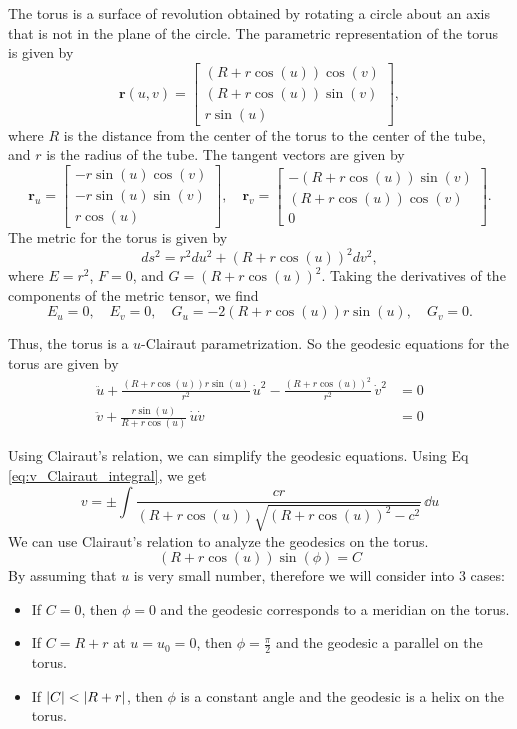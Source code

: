 \documentclass[12pt]{article}
\begin{document}
The torus is a surface of revolution obtained by rotating a circle about an axis that is not in the plane of the circle.
The parametric representation of the torus is given by
\[
    \mathbf{r}(u, v) = \begin{bmatrix} (R + r \cos (u)) \cos (v) \\ (R + r \cos (u)) \sin (v) \\ r \sin (u) \end{bmatrix},
\]
where \(R\) is the distance from the center of the torus to the center of the tube, and \(r\) is the radius of the tube.
The tangent vectors are given by
\[
    \mathbf{r}_u = \begin{bmatrix} -r \sin (u) \cos (v) \\ -r \sin (u) \sin (v) \\ r \cos (u) \end{bmatrix}, \quad \mathbf{r}_v = \begin{bmatrix} -(R + r \cos (u)) \sin (v) \\ (R + r \cos (u)) \cos (v) \\ 0 \end{bmatrix}.
\]
The metric for the torus is given by
\[
    ds^2 = r^2 du^2 + (R + r \cos (u))^2 dv^2,
\]
where \(E = r^2\), \(F = 0\), and \(G = (R + r \cos (u))^2\).
Taking the derivatives of the components of the metric tensor, we find
\[
    E_u = 0, \quad E_v = 0, \quad G_u = -2(R + r \cos (u))r \sin (u), \quad G_v = 0.
\]

Thus, the torus is a $u$-Clairaut parametrization.
So the geodesic equations for the torus are given by
\begin{align*}
    \ddot{u} + \frac{(R + r \cos (u))r \sin (u)}{r^2}\,\dot{u}^2 - \frac{(R + r \cos (u))^2}{r^2}\,\dot{v}^{2} &= 0 \\
    \ddot{v} + \frac{r \sin (u)}{R + r \cos (u)}\,\dot{u}\dot{v} &= 0
\end{align*}

Using Clairaut's relation, we can simplify the geodesic equations.
Using Eq \eqref{eq:v_Clairaut_integral}, we get
\[
    v = \pm \int \frac{cr}{(R + r \cos (u))\sqrt{(R + r \cos (u))^2 - c^2}}\,\dd{u}
\]
We can use Clairaut's relation to analyze the geodesics on the torus.
\[
    (R + r \cos (u)) \sin(\phi) = C
\]
By assuming that $u$ is very small number, therefore we will consider into 3 cases:

\begin{itemize}
    \item If $C = 0$, then $\phi = 0$ and the geodesic corresponds to a meridian on the torus.
    \item If $C = R + r$ at $u = u_0 = 0$, then $\phi = \frac{\pi}{2}$ and the geodesic a parallel on the torus.
    \item If $\abs{C} < \abs{R + r}$, then $\phi$ is a constant angle and the geodesic is a helix on the torus.
\end{itemize}
\end{document}
